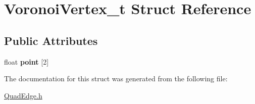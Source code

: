 \hypertarget{structVoronoiVertex__t}{
\section{VoronoiVertex\_\-t Struct Reference}
\label{structVoronoiVertex__t}
}
\subsection*{Public Attributes}
\begin{DoxyCompactItemize}
\item 
\hypertarget{structVoronoiVertex__t_adf4af93bbc408d0dca5ad527bf4d607e}{
float {\bfseries point} \mbox{[}2\mbox{]}}
\label{structVoronoiVertex__t_adf4af93bbc408d0dca5ad527bf4d607e}

\end{DoxyCompactItemize}


The documentation for this struct was generated from the following file:\begin{DoxyCompactItemize}
\item 
\hyperlink{QuadEdge_8h}{QuadEdge.h}\end{DoxyCompactItemize}
